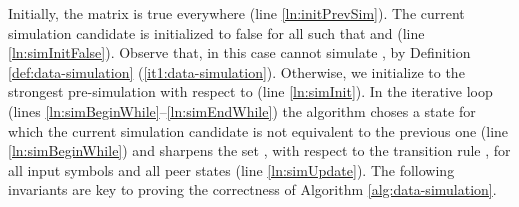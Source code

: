 \documentclass{llncs}
\begin{document}
Initially, the matrix  is true everywhere (line
\ref{ln:initPrevSim}). The current simulation candidate 
is initialized to false for all  such that 
and  (line \ref{ln:simInitFalse}). Observe that, in
this case  cannot simulate , by Definition
\ref{def:data-simulation} (\ref{it1:data-simulation}). Otherwise, we
initialize  to the strongest pre-simulation with
respect to  (line \ref{ln:simInit}). In the
iterative loop (lines \ref{ln:simBeginWhile}--\ref{ln:simEndWhile})
the algorithm choses a state  for which the current simulation
candidate  is not equivalent to the previous one
 (line \ref{ln:simBeginWhile}) and sharpens the
set , with respect to the transition rule , for all input symbols 
and all peer states  (line \ref{ln:simUpdate}).
The following invariants are key to proving the correctness of
Algorithm \ref{alg:data-simulation}.
\end{document}
